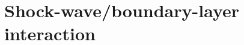 \section{Shock-wave/boundary-layer interaction}
\label{sec:comparative:shock-boundary-layer-interaction}
